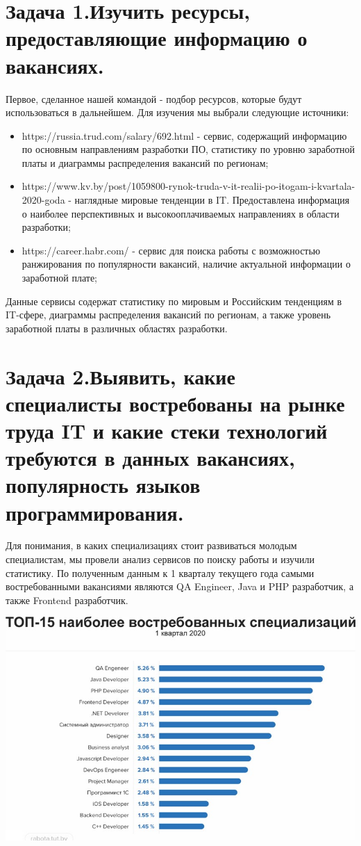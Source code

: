 \documentclass{article}
\begin{document}
\section{Задача 1.Изучить ресурсы, предоставляющие информацию о вакансиях.}

Первое, сделанное нашей командой - подбор ресурсов, которые будут использоваться в дальнейшем. Для изучения мы выбрали следующие источники:
\begin{itemize}
  \item https://russia.trud.com/salary/692.html - сервис, содержащий информацию по основным направлениям разработки ПО, статистику по уровню заработной платы и диаграммы распределения вакансий по регионам;
  \item https://www.kv.by/post/1059800-rynok-truda-v-it-realii-po-itogam-i-kvartala-2020-goda - наглядные мировые тенденции в IT. Предоставлена информация о наиболее перспективных и высокооплачиваемых направлениях в области разработки;
  \item https://career.habr.com/ - сервис для поиска работы с возможностью ранжирования по популярности вакансий, наличие актуальной информации о заработной плате;
\end{itemize}

Данные сервисы содержат статистику по мировым и Российским тенденциям в IT-сфере, диаграммы распределения вакансий по регионам, а также уровень заработной платы в различных областях разработки. 

\newpage
\section{Задача 2.Выявить, какие специалисты востребованы на рынке труда IT и какие стеки технологий требуются в данных вакансиях, популярность языков программирования.}

Для понимания, в каких специализациях стоит развиваться молодым специалистам, мы провели анализ сервисов по поиску работы и изучили статистику. По полученным данным к 1 кварталу текущего года самыми востребованными вакансиями являются QA Engineer, Java и PHP разработчик, а также Frontend разработчик. 

\includegraphics[width=\textwidth]{Images/1.jpg}
\end{document}
